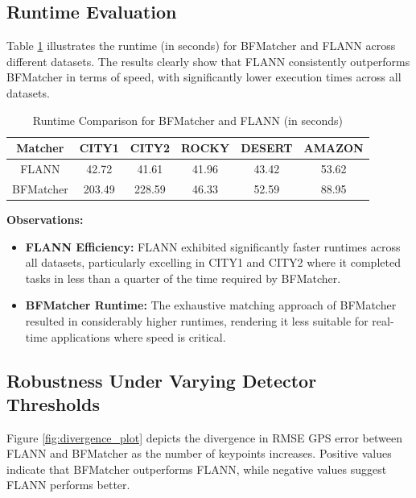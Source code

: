 \subsection{Runtime Evaluation}

Table \ref{tab:flann_bf_comparison_runtime} illustrates the runtime (in seconds) for BFMatcher and FLANN across different datasets. The results clearly show that FLANN consistently outperforms BFMatcher in terms of speed, with significantly lower execution times across all datasets.

\begin{table}[H]
    \centering
    \caption{Runtime Comparison for BFMatcher and FLANN (in seconds)}
    \label{tab:flann_bf_comparison_runtime}
    \begin{tabular}{|c|c|c|c|c|c|}
    \hline
    \textbf{Matcher} & \textbf{CITY1} & \textbf{CITY2} & \textbf{ROCKY} & \textbf{DESERT} & \textbf{AMAZON} \\ \hline
    FLANN          & 42.72           & 41.61          & 41.96          & 43.42           & 53.62           \\ \hline
    BFMatcher      & 203.49          & 228.59         & 46.33          & 52.59           & 88.95           \\ \hline
    \end{tabular}
\end{table}

\textbf{Observations:}
\begin{itemize}
    \item \textbf{FLANN Efficiency:} FLANN exhibited significantly faster runtimes across all datasets, particularly excelling in CITY1 and CITY2 where it completed tasks in less than a quarter of the time required by BFMatcher.
    \item \textbf{BFMatcher Runtime:} The exhaustive matching approach of BFMatcher resulted in considerably higher runtimes, rendering it less suitable for real-time applications where speed is critical.
\end{itemize}

\subsection{Robustness Under Varying Detector Thresholds}

Figure \ref{fig:divergence_plot} depicts the divergence in RMSE GPS error between FLANN and BFMatcher as the number of keypoints increases. Positive values indicate that BFMatcher outperforms FLANN, while negative values suggest FLANN performs better.

